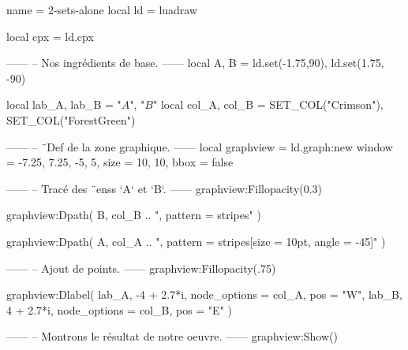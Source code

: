 \documentclass[border = 3pt]{standalone}
\begin{document}
\begin{luadraw*}{name = 2-sets-alone}
local ld = luadraw

local cpx = ld.cpx

------
-- Nos ingrédients de base.
------
local A, B = ld.set(-1.75,90), ld.set(1.75, -90)

local lab_A, lab_B = "$A$", "$B$"
local col_A, col_B = SET_COL("Crimson"), SET_COL("ForestGreen")

------
-- ¨Def de la zone graphique.
------
local graphview = ld.graph:new{
  window = {-7.25, 7.25, -5, 5},
  size   = {10, 10},
  bbox   = false
}

------
-- Tracé des ¨enss `A` et `B`.
------
graphview:Fillopacity(0.3)

graphview:Dpath(
  B,
  col_B .. ", pattern = stripes"
)

graphview:Dpath(
  A,
  col_A .. ", pattern = {stripes[size = 10pt, angle = -45]}"
)

------
-- Ajout de points.
------
graphview:Fillopacity(.75)

graphview:Dlabel(
  lab_A, -4 + 2.7*i, {node_options = col_A, pos = "W"},
  lab_B,  4 + 2.7*i, {node_options = col_B, pos = "E"}
)

------
-- Montrons le résultat de notre oeuvre.
------
graphview:Show()
\end{luadraw*}
\end{document}

